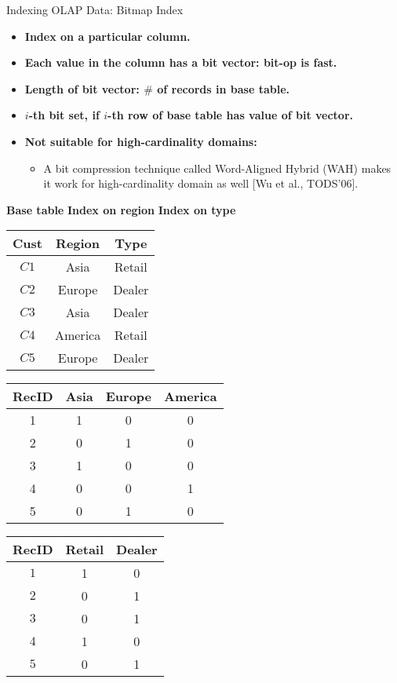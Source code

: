 \begin{frame}{Indexing OLAP Data: Bitmap Index}
  \begin{itemize}
  \item \textbf{Index on a particular column.}
  \item \textbf{Each value in the column has a bit vector: bit-op is fast.}
  \item \textbf{Length of bit vector: $\#$ of records in base table.}
  \item \textbf{$i$-th bit set, if $i$-th row of base table has value of bit vector.}
  \item \textbf{Not suitable for high-cardinality domains:}
    \begin{itemize}
    \item A bit compression technique called Word-Aligned Hybrid (WAH) makes it work for high-cardinality domain as well [Wu et al., TODS'06].
    \end{itemize}
  \end{itemize}
  \centering
  \textbf{Base table} \hspace{2.5cm} \textbf{Index on region} \hspace{2.5cm} \textbf{Index on type}\\
  \begin{tabular}{| c | c | c |}
    \hline
    \textbf{Cust} & \textbf{Region} & \textbf{Type}\\\hline
    $C1$ & Asia & Retail\\\hline
    $C2$ & Europe & Dealer\\\hline
    $C3$ & Asia & Dealer\\\hline
    $C4$ & America & Retail\\\hline
    $C5$ & Europe & Dealer\\\hline
  \end{tabular}\hspace{0.1cm}
  \begin{tabular}{| c | c | c | c |}
    \hline
    \textbf{RecID} & \textbf{Asia} & \textbf{Europe} & \textbf{America}\\\hline
    1 & 1 & 0 & 0 \\\hline
    2 & 0 & 1 & 0 \\\hline
    3 & 1 & 0 & 0 \\\hline
    4 & 0 & 0 & 1 \\\hline
    5 & 0 & 1 & 0 \\\hline
  \end{tabular}\hspace{0.1cm}
  \begin{tabular}{| c | c | c |}
    \hline
    \textbf{RecID} & \textbf{Retail} & \textbf{Dealer}\\\hline
    $1$ & 1 & 0\\\hline
    $2$ & 0 & 1\\\hline
    $3$ & 0 & 1\\\hline
    $4$ & 1 & 0\\\hline
    $5$ & 0 & 1\\\hline
  \end{tabular}
\end{frame}

